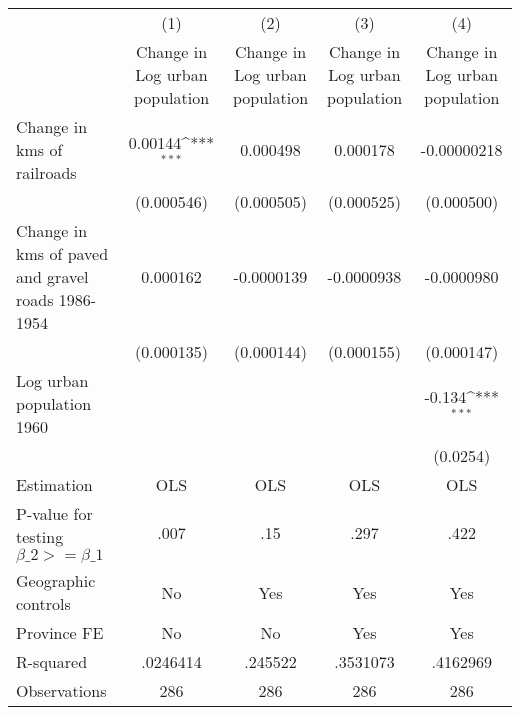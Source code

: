 {
\def\sym#1{\ifmmode^{#1}\else\(^{#1}\)\fi}
\begin{tabular}{l*{4}{c}}
\hline\hline
                &\multicolumn{1}{c}{(1)}&\multicolumn{1}{c}{(2)}&\multicolumn{1}{c}{(3)}&\multicolumn{1}{c}{(4)}\\
                &\multicolumn{1}{c}{Change in Log urban population}&\multicolumn{1}{c}{Change in Log urban population}&\multicolumn{1}{c}{Change in Log urban population}&\multicolumn{1}{c}{Change in Log urban population}\\
\hline
Change in kms of railroads&  0.00144\sym{***}& 0.000498         & 0.000178         &-0.00000218         \\
                &(0.000546)         &(0.000505)         &(0.000525)         &(0.000500)         \\
[1em]
Change in kms of paved and gravel roads 1986-1954& 0.000162         &-0.0000139         &-0.0000938         &-0.0000980         \\
                &(0.000135)         &(0.000144)         &(0.000155)         &(0.000147)         \\
[1em]
Log urban population 1960&                  &                  &                  &   -0.134\sym{***}\\
                &                  &                  &                  & (0.0254)         \\
\hline
Estimation      &      OLS         &      OLS         &      OLS         &      OLS         \\
P-value for testing $\beta\_2 >= \beta\_1$&     .007         &      .15         &     .297         &     .422         \\
Geographic controls&       No         &      Yes         &      Yes         &      Yes         \\
Province FE     &       No         &       No         &      Yes         &      Yes         \\
R-squared       & .0246414         &  .245522         & .3531073         & .4162969         \\
Observations    &      286         &      286         &      286         &      286         \\
\hline\hline
\end{tabular}
}
